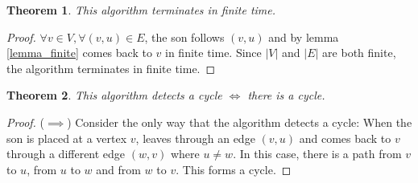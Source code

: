 \documentclass{article}
\newtheorem{theorem}{Theorem}
\begin{document}
\begin{enumerate}
\begin{theorem}This algorithm terminates in finite time.\end{theorem}
\begin{proof} $\forall v\in V, \forall (v,u)\in E$, the son follows $(v,u)$ and by lemma \ref{lemma_finite} comes back to $v$ in finite time. Since $|V|$ and $|E|$ are both finite, the algorithm terminates in finite time.

\end{proof}

\begin{theorem}This algorithm detects a cycle $\iff$ there is a cycle.\end{theorem}
\begin{proof}
($\implies$) Consider the only way that the algorithm detects a cycle: When the son is placed at a vertex $v$, leaves through an edge $(v,u)$ and comes back to $v$ through a different edge $(w,v)$ where $u\not=w$. In this case, there is a path from $v$ to $u$, from $u$ to $w$ and from $w$ to $v$. This forms a cycle.


\end{proof}
\end{enumerate}
\end{document}
